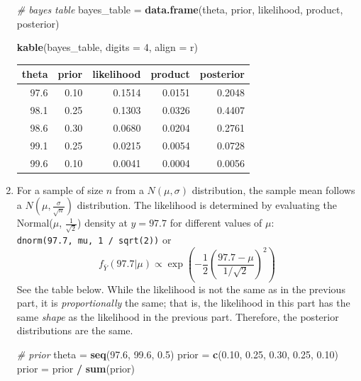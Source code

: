 \documentclass[
]{book}
\newenvironment{Shaded}{\begin{snugshade}}{\end{snugshade}}
\newcommand{\CommentTok}[1]{\textcolor[rgb]{0.56,0.35,0.01}{\textit{#1}}}
\newcommand{\DataTypeTok}[1]{\textcolor[rgb]{0.13,0.29,0.53}{#1}}
\newcommand{\DecValTok}[1]{\textcolor[rgb]{0.00,0.00,0.81}{#1}}
\newcommand{\FloatTok}[1]{\textcolor[rgb]{0.00,0.00,0.81}{#1}}
\newcommand{\KeywordTok}[1]{\textcolor[rgb]{0.13,0.29,0.53}{\textbf{#1}}}
\newcommand{\NormalTok}[1]{#1}
\newcommand{\OperatorTok}[1]{\textcolor[rgb]{0.81,0.36,0.00}{\textbf{#1}}}
\newcommand{\StringTok}[1]{\textcolor[rgb]{0.31,0.60,0.02}{#1}}
\theoremstyle{definition}
\theoremstyle{definition}
\theoremstyle{definition}
\theoremstyle{remark}
\begin{document}
\begin{enumerate}
\begin{Shaded}
\begin{Highlighting}[]
\CommentTok{\# bayes table}
\NormalTok{bayes\_table =}\StringTok{ }\KeywordTok{data.frame}\NormalTok{(theta,}
\NormalTok{                     prior,}
\NormalTok{                     likelihood,}
\NormalTok{                     product,}
\NormalTok{                     posterior)}

\KeywordTok{kable}\NormalTok{(bayes\_table, }\DataTypeTok{digits =} \DecValTok{4}\NormalTok{, }\DataTypeTok{align =} \StringTok{\textquotesingle{}r\textquotesingle{}}\NormalTok{)}
\end{Highlighting}
\end{Shaded}

  \begin{tabular}{r|r|r|r|r}
   \hline
   theta & prior & likelihood & product & posterior\\
   \hline
   97.6 & 0.10 & 0.1514 & 0.0151 & 0.2048\\
   \hline
   98.1 & 0.25 & 0.1303 & 0.0326 & 0.4407\\
   \hline
   98.6 & 0.30 & 0.0680 & 0.0204 & 0.2761\\
   \hline
   99.1 & 0.25 & 0.0215 & 0.0054 & 0.0728\\
   \hline
   99.6 & 0.10 & 0.0041 & 0.0004 & 0.0056\\
   \hline
   \end{tabular}
\item
  For a sample of size \(n\) from a \(N(\mu,\sigma)\) distribution, the sample mean follows a \(N\left(\mu, \frac{\sigma}{\sqrt{n}}\right)\) distribution. The likelihood is determined by evaluating the Normal(\(\mu\), \(\frac{1}{\sqrt{2}}\)) density at \(y=97.7\) for different values of \(\mu\): \texttt{dnorm(97.7,\ mu,\ 1\ /\ sqrt(2))} or
  \[
  f_{\bar{Y}}(97.7|\mu)  \propto \exp\left(-\frac{1}{2}\left(\frac{97.7-\mu}{1/\sqrt{2}}\right)^2\right)
  \]
  See the table below. While the likelihood is not the same as in the previous part, it is \emph{proportionally} the same; that is, the likelihood in this part has the same \emph{shape} as the likelihood in the previous part. Therefore, the posterior distributions are the same.

\begin{Shaded}
\begin{Highlighting}[]
\CommentTok{\# prior}
\NormalTok{theta =}\StringTok{ }\KeywordTok{seq}\NormalTok{(}\FloatTok{97.6}\NormalTok{, }\FloatTok{99.6}\NormalTok{, }\FloatTok{0.5}\NormalTok{)}
\NormalTok{prior =}\StringTok{ }\KeywordTok{c}\NormalTok{(}\FloatTok{0.10}\NormalTok{, }\FloatTok{0.25}\NormalTok{, }\FloatTok{0.30}\NormalTok{, }\FloatTok{0.25}\NormalTok{, }\FloatTok{0.10}\NormalTok{)}
\NormalTok{prior =}\StringTok{ }\NormalTok{prior }\OperatorTok{/}\StringTok{ }\KeywordTok{sum}\NormalTok{(prior)}


\end{Highlighting}
\end{Shaded}
\end{enumerate}
\end{document}
